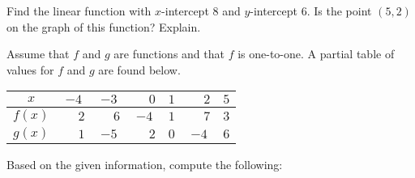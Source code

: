\documentclass[12pt,letterpaper]{exam}
\begin{document}
\begin{questions}



\newpage
\question[10] Find the linear function with $x$-intercept 8 and $y$-intercept 6. Is the point $(5, 2)$ on the graph of this function? Explain. 



\newpage
\question Assume that $f$ and $g$ are functions and that $f$ is one-to-one. A partial table of values for $f$ and $g$ are found below. \par
	\begin{table}[ht]
	\centering
	\begin{tabular}{|c||c|c|c|c|c|c|} \hline 
	$x$ & $-4$ & $-3$ & $\phantom{-}0$ & $1$ & $\phantom{-}2$ & $5$ \\ \hline \hline
	$f(x)$ & $\phantom{-}2$ & $\phantom{-}6$ & $-4$ & $1$ & $\phantom{-}7$ & $3$ \\ \hline
	$g(x)$ & $\phantom{-}1$ & $-5$ & $\phantom{-}2$ & $0$ & $-4$ & $6$ \\ \hline 
	\end{tabular}
	\end{table} \par
Based on the given information, compute the following: \pspace

\end{questions}
\end{document}
